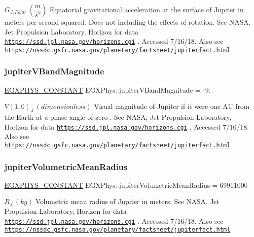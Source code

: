 $ G_{J,Polar} \ (\dfrac{m}{s^2})$ Equatorial gravitational acceleration at the surface of Jupiter in meters per second squared. Does not including the effects of rotation. See N\+A\+SA, Jet Propulsion Laboratory, Horizon for data \href{https://ssd.jpl.nasa.gov/horizons.cgi}{\tt https\+://ssd.\+jpl.\+nasa.\+gov/horizons.\+cgi} . Accessed 7/16/18. Also see \href{https://nssdc.gsfc.nasa.gov/planetary/factsheet/jupiterfact.html}{\tt https\+://nssdc.\+gsfc.\+nasa.\+gov/planetary/factsheet/jupiterfact.\+html} \mbox{\label{group___e_g_x_phys-_constants-_astrophysics-_solar_system-_jupiter-_bulk_ga58ab15a15b0a0512da0f1adae198ec69}} 
\subsubsection{\texorpdfstring{jupiter\+V\+Band\+Magnitude}{jupiterVBandMagnitude}}
{\footnotesize\ttfamily \mbox{\hyperlink{group___e_g_x_phys-_constants-_macros_ga76980d288494ce1714c9ac68a95ba702}{E\+G\+X\+P\+H\+Y\+S\+\_\+\+C\+O\+N\+S\+T\+A\+NT}} E\+G\+X\+Phys\+::jupiter\+V\+Band\+Magnitude = -\/9.}

$ V(1,0)_{J} \ (dimensionless)$ Visual magnitude of Jupiter if it were one AU from the Earth at a phase angle of zero . See N\+A\+SA, Jet Propulsion Laboratory, Horizon for data \href{https://ssd.jpl.nasa.gov/horizons.cgi}{\tt https\+://ssd.\+jpl.\+nasa.\+gov/horizons.\+cgi} . Accessed 7/16/18. Also see \href{https://nssdc.gsfc.nasa.gov/planetary/factsheet/jupiterfact.html}{\tt https\+://nssdc.\+gsfc.\+nasa.\+gov/planetary/factsheet/jupiterfact.\+html} \mbox{\label{group___e_g_x_phys-_constants-_astrophysics-_solar_system-_jupiter-_bulk_gab96ee9108c321647b7ae0c490e797b6f}} 
\subsubsection{\texorpdfstring{jupiter\+Volumetric\+Mean\+Radius}{jupiterVolumetricMeanRadius}}
{\footnotesize\ttfamily \mbox{\hyperlink{group___e_g_x_phys-_constants-_macros_ga76980d288494ce1714c9ac68a95ba702}{E\+G\+X\+P\+H\+Y\+S\+\_\+\+C\+O\+N\+S\+T\+A\+NT}} E\+G\+X\+Phys\+::jupiter\+Volumetric\+Mean\+Radius = 69911000}

$R_{J} \ (kg)$ Volumetric mean radius of Jupiter in meters. See N\+A\+SA, Jet Propulsion Laboratory, Horizon for data \href{https://ssd.jpl.nasa.gov/horizons.cgi}{\tt https\+://ssd.\+jpl.\+nasa.\+gov/horizons.\+cgi} . Accessed 7/16/18. Also see \href{https://nssdc.gsfc.nasa.gov/planetary/factsheet/jupiterfact.html}{\tt https\+://nssdc.\+gsfc.\+nasa.\+gov/planetary/factsheet/jupiterfact.\+html} 